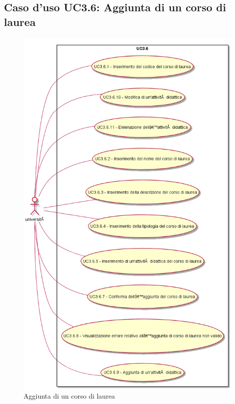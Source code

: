 \subsection{Caso d'uso \texorpdfstring{UC3.6}{UC3.6}: Aggiunta di un corso di laurea}
\begin{figure} [H]
\centering
\includegraphics[scale=0.45]{./img/UC3-6.png}
\caption{Aggiunta di un corso di laurea}\label{}
\end{figure}
